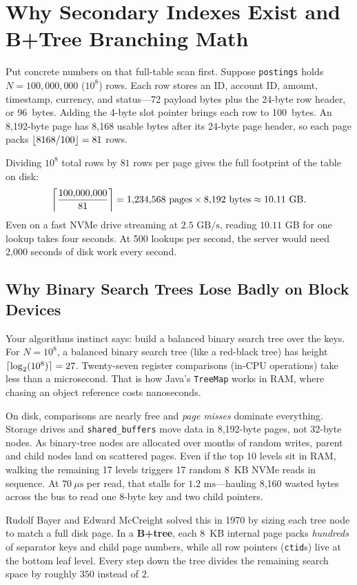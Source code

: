 \section{Why Secondary Indexes Exist and B+Tree Branching Math}
\label{sec:ch03-fanout-math}

Put concrete numbers on that full-table scan first. Suppose \texttt{postings} holds $N = 100{,}000{,}000$ ($10^8$) rows. Each row stores an ID, account ID, amount, timestamp, currency, and status---72 payload bytes plus the 24-byte row header, or 96~bytes. Adding the 4-byte slot pointer brings each row to 100~bytes. An 8,192-byte page has 8,168 usable bytes after its 24-byte page header, so each page packs $\floor{8168 / 100} = 81$ rows.

Dividing $10^8$ total rows by $81$ rows per page gives the full footprint of the table on disk:
\[
  \ceil*{\frac{100{,}000{,}000}{81}} = 1{,}234{,}568 \text{ pages} \times 8{,}192\text{ bytes} \approx 10.11\text{ GB}.
\]
Even on a fast NVMe drive streaming at $2.5\text{ GB/s}$, reading $10.11\text{ GB}$ for one lookup takes four seconds. At 500 lookups per second, the server would need 2,000 seconds of disk work every second.

\subsection{Why Binary Search Trees Lose Badly on Block Devices}

Your algorithms instinct says: build a balanced binary search tree over the keys. For $N = 10^8$, a balanced binary search tree (like a red-black tree) has height $\ceil{\log_2(10^8)} = 27$. Twenty-seven register comparisons (in-CPU operations) take less than a microsecond. That is how Java's \texttt{TreeMap} works in RAM, where chasing an object reference costs nanoseconds.

On disk, comparisons are nearly free and \emph{page misses} dominate everything. Storage drives and \texttt{shared\_buffers} move data in 8,192-byte pages, not 32-byte nodes. As binary-tree nodes are allocated over months of random writes, parent and child nodes land on scattered pages. Even if the top 10 levels sit in RAM, walking the remaining 17 levels triggers 17 random 8~KB NVMe reads in sequence. At $70~\mu\text{s}$ per read, that stalls for $1.2\text{ ms}$---hauling 8,160 wasted bytes across the bus to read one 8-byte key and two child pointers.

Rudolf Bayer and Edward McCreight solved this in 1970 by sizing each tree node to match a full disk page. In a \textbf{B+tree}, each 8~KB internal page packs \emph{hundreds} of separator keys and child page numbers, while all row pointers (\texttt{ctid}s) live at the bottom leaf level. Every step down the tree divides the remaining search space by roughly $350$ instead of $2$.

